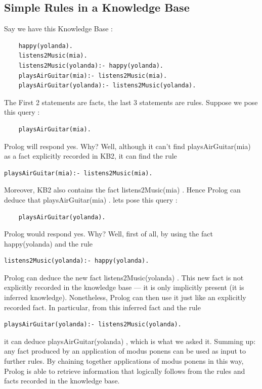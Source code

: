 \documentclass[14pt]{article}
\begin{document}
\subsection{Simple Rules in a Knowledge Base}
Say we have this Knowledge Base :
\begin{verbatim}
	happy(yolanda).
	listens2Music(mia).
	listens2Music(yolanda):- happy(yolanda).
	playsAirGuitar(mia):- listens2Music(mia).
	playsAirGuitar(yolanda):- listens2Music(yolanda).
\end{verbatim}
The First 2 statements are facts, the last 3 statements are 
rules. Suppose we pose this query :
\begin{verbatim}
	playsAirGuitar(mia).
\end{verbatim}
Prolog will respond yes. Why? Well, although it can’t find 
playsAirGuitar(mia) as a fact explicitly recorded in KB2, 
it can find the rule
\begin{verbatim}
playsAirGuitar(mia):- listens2Music(mia).
\end{verbatim}
Moreover, KB2 also contains the fact listens2Music(mia) . Hence Prolog can  deduce that playsAirGuitar(mia) . 
lets pose this query :
\begin{verbatim}
	playsAirGuitar(yolanda).
\end{verbatim}
Prolog would respond yes. Why? Well, first of all, by using the fact happy(yolanda) and the rule
\begin{verbatim}
listens2Music(yolanda):- happy(yolanda).
\end{verbatim}
Prolog can deduce the new fact listens2Music(yolanda) . This new fact is not explicitly recorded in the knowledge base — it is only implicitly present (it is inferred knowledge). Nonetheless, Prolog can then use it just like an explicitly recorded fact. In particular, from this inferred fact and the rule
\begin{verbatim}
playsAirGuitar(yolanda):- listens2Music(yolanda).
\end{verbatim}
it can deduce playsAirGuitar(yolanda) , which is what we asked it. Summing up: any fact produced by an application of modus ponens can be used as input to further rules. By chaining together applications of modus ponens in this way, Prolog is able to retrieve information that logically follows from the rules and facts recorded in the knowledge base.
\newpage 
\end{document}
